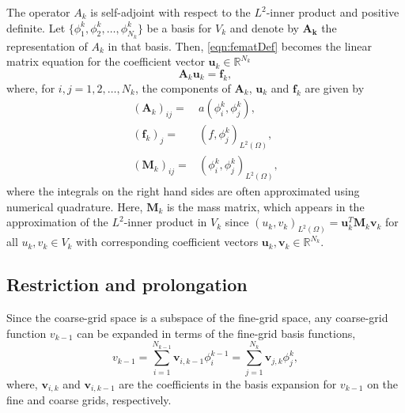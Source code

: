 \documentclass[smallcondensed,final]{svjour3}     %
\begin{document}
The operator $A_k$ is self-adjoint
with respect to the $L^2$-inner product and positive definite.
Let $\{\phi_1^k,\phi_2^k,\ldots,\phi_{N_k}^k\}$ be a basis for $V_k$ and
denote by $\mathbf{A_k}$ the representation of $A_k$ in that
basis. Then, \eqref{eqn:fematDef} becomes the linear matrix equation
for the coefficient vector $\mathbf{u}_k\in \mathbb{R}^{N_k}$
\begin{equation}
\mathbf{A}_k\mathbf{u}_k = \mathbf{f}_k,
\end{equation}
where, for $i,j = 1,2,\ldots,N_k$, the components of $\mathbf A_k$, $\mathbf u_k$ and $\mathbf f_k$ are given by
\begin{align*}
(\mathbf{A}_k)_{ij} =& a(\phi_i^k,\phi_j^k), \\%
(\mathbf{f}_{k})_j   =& (f,\phi_j^k)_{L^2(\Omega)}, \\%
(\mathbf{M}_k)_{ij} =& (\phi_i^k,\phi_j^k)_{L^2(\Omega)},
\end{align*}
where the integrals on the right hand sides are often approximated
using numerical quadrature.
Here, $\mathbf{M}_k$ is the mass matrix, which appears in the
approximation of the $L^2$-inner product in $V_k$ since
$(u_k,v_k)_{L^2(\Omega)} = \mathbf{u}_k^T\mathbf{M}_k\mathbf{v}_k$ for
all $u_k,v_k\in V_k$ with corresponding coefficient vectors
$\mathbf{u}_k,\mathbf{v}_k\in \mathbb{R}^{N_k}$.



\subsection{Restriction and prolongation} %
\label{sub:restriction_&_prolongation}
Since the coarse-grid space is a subspace of the fine-grid
space, any coarse-grid function $v_{k-1}$ can be expanded in
terms of the fine-grid basis functions,
\begin{equation} 
  v_{k-1} = \sum_{i=1}^{N_{k-1}} \mathbf v_{i,k-1}\phi_i^{k-1} = \sum_{j=1}^{N_k} \mathbf v_{j,k}\phi_j^k, 
\end{equation} 
where, $\mathbf v_{i,k}$ and $\mathbf v_{i,k-1}$ are the coefficients in the basis
expansion for $v_{k-1}$ on the fine and coarse grids, respectively.
\end{document}
